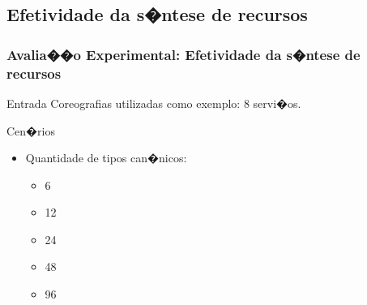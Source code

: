 \documentclass[compress]{beamer}
\newcommand\Wider[2][3em]{%
\makebox[\linewidth][c]{%
  \begin{minipage}{\dimexpr\textwidth+#1\relax}
  \raggedright#2
  \end{minipage}%
  }%
}
\begin{document}



\subsection[\textbullet]{Efetividade da s�ntese de recursos}
\frame
{
 \frametitle{Avalia��o Experimental: Efetividade da s�ntese de recursos}
\begin{block}{Entrada}
Coreografias utilizadas como exemplo: 8 servi�os.
\end{block}
 \begin{block}{Cen�rios}
\begin{itemize}
\item Quantidade de tipos can�nicos:
\begin{itemize}
\item  6
\item 12
\item 24
\item 48
\item 96
\end{itemize}
\end{itemize}
\end{block}
}

\end{document}
